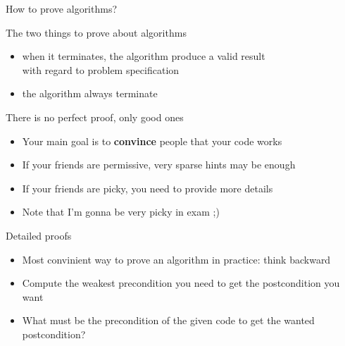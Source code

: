 \begin{frame}{How to prove algorithms?}
  \begin{block}{The two things to prove about algorithms}
    \begin{itemize}
    \item {}
      when it terminates, the algorithm produce a valid result\\
      {\small with regard to problem specification}
    \item {} the algorithm always terminate
    \end{itemize}
  \end{block}
  \begin{block}{There is no perfect proof, only good ones}
    \begin{itemize}
    \item Your main goal is to \textbf{convince} people that your code works
    \item If your friends are permissive, very sparse hints may be enough
    \item If your friends are picky, you need to provide more details
    \item Note that I'm gonna be very picky in exam ;)
    \end{itemize}
  \end{block}
  \begin{block}{Detailed proofs}
    \begin{itemize}
    \item Most convinient way to prove an algorithm in practice: think backward
    \item Compute the weakest precondition you need to get the postcondition you
      want
    \item What must be the precondition of the given code to get the
        wanted postcondition?
    \end{itemize}
  \end{block}

\end{frame}
\newcommand{\WP}[1]{\textbf{WP}($#1$)}
